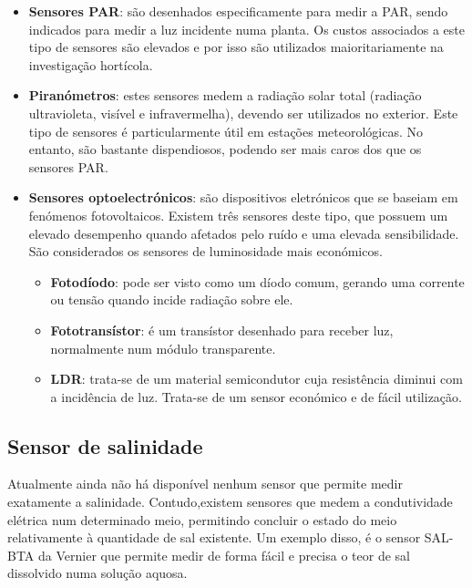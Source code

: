 \begin{itemize}
	\item \textbf{Sensores \ac{PAR}}: são desenhados especificamente para medir a \ac{PAR}, sendo indicados para medir a luz incidente numa planta. Os custos associados a este tipo de sensores são elevados e por isso são utilizados maioritariamente na investigação hortícola. 
	


	
	
	
	\item \textbf{Piranómetros}: estes sensores medem a radiação solar total (radiação ultravioleta, visível e infravermelha), devendo ser utilizados no exterior. Este tipo de sensores é particularmente útil em estações meteorológicas. No entanto, são bastante dispendiosos, podendo ser mais caros dos que os sensores \ac{PAR}. 
	
	
	
	
	\item \textbf{Sensores optoelectrónicos}: são dispositivos eletrónicos que se baseiam em fenómenos fotovoltaicos. Existem três sensores deste tipo, que possuem um elevado desempenho quando afetados pelo ruído e uma elevada sensibilidade. São considerados os sensores de luminosidade mais económicos.  
	 
		\begin{itemize}
			\item \textbf{Fotodíodo}: pode ser visto como um díodo comum, gerando uma corrente ou tensão quando incide radiação sobre ele.
			\item \textbf{Fototransístor}: é um transístor desenhado para receber luz, normalmente num módulo transparente.
			\item \textbf{\ac{LDR}}: trata-se de um material semicondutor cuja resistência diminui com a incidência de luz. Trata-se de um sensor económico e de fácil utilização. 
		\end{itemize}
	
\end{itemize}





\subsection{Sensor de salinidade}


Atualmente ainda não há disponível nenhum sensor que permite medir exatamente a salinidade. Contudo,existem sensores que medem a condutividade elétrica num determinado meio, permitindo concluir o estado do meio relativamente à quantidade de sal existente. 
Um exemplo disso, é o sensor SAL-BTA da Vernier\cite{sall} que permite medir de forma fácil e precisa o teor de sal dissolvido numa solução aquosa.




